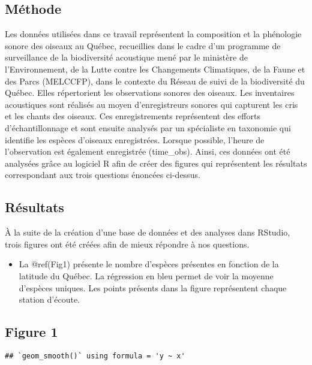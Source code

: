 \documentclass[
]{article}
\providecommand{\tightlist}{%
  \setlength{\itemsep}{0pt}\setlength{\parskip}{0pt}}
\begin{document}
\hypertarget{muxe9thode}{%
\subsection{Méthode}\label{muxe9thode}}

Les données utilisées dans ce travail représentent la composition et la
phénologie sonore des oiseaux au Québec, recueillies dans le cadre d'un
programme de surveillance de la biodiversité acoustique mené par le
ministère de l'Environnement, de la Lutte contre les Changements
Climatiques, de la Faune et des Parcs (MELCCFP), dans le contexte du
Réseau de suivi de la biodiversité du Québec. Elles répertorient les
observations sonores des oiseaux. Les inventaires acoustiques sont
réalisés au moyen d'enregistreurs sonores qui capturent les cris et les
chants des oiseaux. Ces enregistrements représentent des efforts
d'échantillonnage et sont ensuite analysés par un spécialiste en
taxonomie qui identifie les espèces d'oiseaux enregistrées. Lorsque
possible, l'heure de l'observation est également enregistrée
(time\_obs). Ainsi, ces données ont été analysées grâce au logiciel R
afin de créer des figures qui représentent les résultats correspondant
aux trois questions énoncées ci-dessus.

\hypertarget{ruxe9sultats}{%
\subsection{Résultats}\label{ruxe9sultats}}

À la suite de la création d'une base de données et des analyses dans
RStudio, trois figures ont été créées afin de mieux répondre à nos
questions.

\begin{itemize}
\tightlist
\item
  La @ref(Fig1) présente le nombre d'espèces présentes en fonction de la
  latitude du Québec. La régression en bleu permet de voir la moyenne
  d'espèces uniques. Les points présents dans la figure représentent
  chaque station d'écoute.
\end{itemize}

\hypertarget{figure-1}{%
\subsection{Figure 1}\label{figure-1}}

\begin{verbatim}
## `geom_smooth()` using formula = 'y ~ x'
\end{verbatim}
\end{document}
